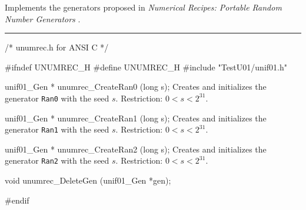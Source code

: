 
Implements the  generators proposed in
{\em Numerical Recipes: Portable Random Number Generators\/}
 \cite{rPRE92a,rPRE92b}.


\bigskip
\hrule
\code
\hide
/* unumrec.h for ANSI C */

#ifndef UNUMREC_H
#define UNUMREC_H
\endhide
#include "TestU01/unif01.h"


unif01_Gen * unumrec_CreateRan0 (long s);
\endcode
  \tab Creates and initializes the generator {\tt Ran0} with the seed $s$.
%
   Restriction: $0 < s < 2^{31}$.
 \endtab
\code


unif01_Gen * unumrec_CreateRan1 (long s);
\endcode
  \tab Creates and initializes the generator {\tt Ran1} with the seed $s$.
%
 Restriction: $0 < s < 2^{31}$.
 \endtab
\code


unif01_Gen * unumrec_CreateRan2 (long s);
\endcode
  \tab  Creates and initializes the generator {\tt Ran2} with the seed $s$.
%
  Restriction: $0 < s < 2^{31}$.
 \endtab



\code

void unumrec_DeleteGen (unif01_Gen *gen);
\endcode
 \tab \DelGen
 \endtab
\code

\hide
#endif
\endhide
\endcode
